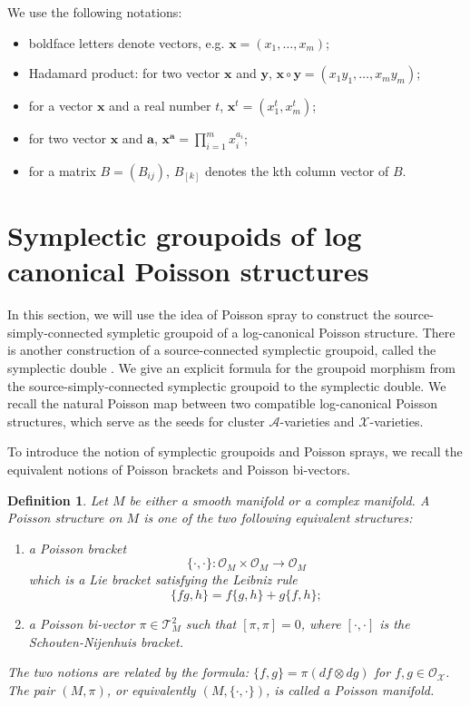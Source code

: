 \documentclass{amsart}
\newtheorem{definition}[theorem]{Definition}
\numberwithin{equation}{section}
\newcommand{\bfa}{\mathbf{a}}
\newcommand{\bfx}{\mathbf{x}}
\newcommand{\bfy}{\mathbf{y}}
\newcommand{\cA}{\mathcal{A}}
\newcommand{\cO}{\mathcal{O}}
\newcommand{\cX}{\mathcal{X}}
\newcommand{\cT}{\mathcal{T}}
\begin{document}
\bigskip


We use the following notations:
\begin{itemize}
	\item boldface letters denote vectors, e.g. $\bfx = (x_1, \ldots, x_m)$;
	\item Hadamard product: for two vector $\bfx$ and $\bfy$, $\bfx \circ \bfy = (x_1y_1, \ldots, x_my_m)$;
	\item for a vector $\bfx$ and a real number $t$, $\bfx^t = (x_1^t, x_m^t)$;
	\item for two vector $\bfx$ and $\bfa$, $\bfx^\bfa = \prod_{i=1}^m x_i^{a_i}$;
	\item for a matrix $B = (B_{ij})$, $B_{[k]}$ denotes the kth column vector of $B$.
\end{itemize}


\section{Symplectic groupoids of log canonical Poisson structures} \label{sec: local}

In this section, we will use the idea of Poisson spray \cite{MR2900786} to construct the source-simply-connected sympletic groupoid of a log-canonical Poisson structure.
There is another construction of a source-connected symplectic groupoid, called the symplectic double \cite{MR2470108}.
We give an explicit formula for the groupoid morphism from the source-simply-connected symplectic groupoid to the symplectic double.
We recall the natural Poisson map between two compatible log-canonical Poisson structures, which serve as the seeds for cluster $\cA$-varieties and $\cX$-varieties.

To introduce the notion of symplectic groupoids and Poisson sprays, we recall the equivalent notions of Poisson brackets and Poisson bi-vectors.
\begin{definition}
  Let $M$ be either a smooth manifold or a complex manifold.
  A \emph{Poisson structure} on $M$ is one of the two following equivalent structures:
  \begin{enumerate}
    \item a \emph{Poisson bracket}
      $$\{\cdot, \cdot\}: \cO_M \times \cO_M \to \cO_M$$
      which is a Lie bracket satisfying the Leibniz rule
      $$\{fg, h\} = f\{g,h\} + g\{f,h\};$$
    \item a \emph{Poisson bi-vector} $\pi \in \cT^2_M$ such that $[\pi, \pi] = 0$, where $[\cdot, \cdot]$ is the Schouten-Nijenhuis bracket.
  \end{enumerate}	
  The two notions are related by the formula: $\{f, g\} = \pi (df \otimes dg)$ for $f, g\in \cO_\cX$.
  The pair $(M, \pi)$, or equivalently $(M, \{\cdot,\cdot\})$, is called a \emph{Poisson manifold}.
\end{definition}
\end{document}
